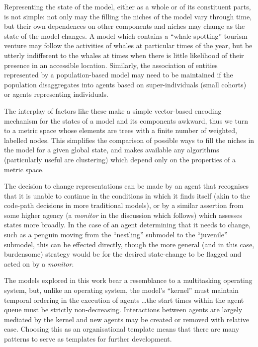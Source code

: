 Representing the state of the model, either as a whole or of its
constituent parts, is not simple: not only may the filling the niches
of the model vary through time, but their own dependences on other
components and niches may change as the state of the model changes. A
model which contains a ``whale spotting'' tourism venture may follow
the activities of whales at particular times of the year, but be
utterly indifferent to the whales at times when there is little
likelihood of their presence in an accessible location. Similarly, the
association of entities represented by a population-based model may
need to be maintained if the population dis\-aggregates into agents
based on super-individuals (small cohorts) or agents representing
individuals.

The interplay of factors like these make a simple vector-based
encoding mechanism for the states of a model and its components
awkward, thus we turn to a metric space whose elements are trees with
a finite number of weighted, labelled nodes. This simplifies the
comparison of possible ways to fill the niches in the model for a
given global state, and makes available any algorithms (particularly
useful are clustering) which depend only on the properties of a metric
space.

The decision to change representations can be made by an agent that
recognises that it is unable to continue in the conditions in which it
finds itself (akin to the code-path decisions in more traditional
models), or by a similar assertion from some higher agency
(a \emph{monitor\/} in the discussion which follows) which assesses
states more broadly.  In the case of an agent determining that it
needs to change, such as a penguin moving from the ``nestling''
submodel to the ``juvenile'' submodel, this can be effected directly,
though the more general (and in this case, burdensome) strategy would
be for the desired state-change to be flagged and acted on by
a \emph{monitor\/}.

The models explored in this work bear a resemblance to a multitasking
operating system, but, unlike an operating system, the model's ``kernel''
must maintain temporal ordering in the execution of agents \ldots the
start times within the agent queue must be strictly non-decreasing.
Interactions between agents are largely mediated by the kernel and
new agents may be created or removed with relative ease.  Choosing
this as an organisational template means that there are many patterns
to serve as templates for further development.

